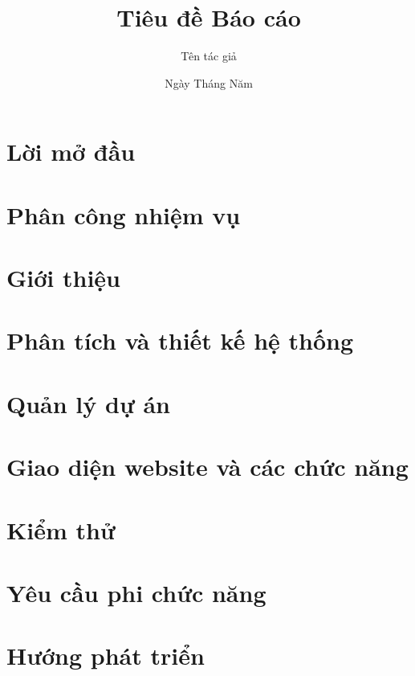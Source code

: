 \documentclass[11pt]{report}
\title{Tiêu đề Báo cáo}
\author{Tên tác giả}
\date{Ngày Tháng Năm}
\begin{document}



\chapter*{Lời mở đầu}

\chapter*{Phân công nhiệm vụ}



\listoffigures

\listoftables

\clearpage


\glsaddall 
\printglossary[type=\acronymtype,title={Danh mục các từ viết tắt}]
\tableofcontents

\doublespacing
\chapter{Giới thiệu}


\chapter{Phân tích và thiết kế hệ thống}


\chapter{Quản lý dự án}


\chapter{Giao diện website và các chức năng}


\chapter{Kiểm thử}


\chapter{Yêu cầu phi chức năng}


\chapter{Hướng phát triển}


\singlespacing
\printbibliography[heading=bibintoc, title={Tài liệu tham khảo}]
\end{document}
